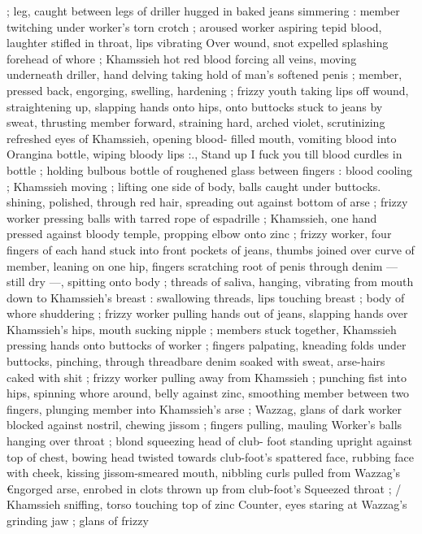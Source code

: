 ; leg, caught between legs of driller hugged in baked jeans 
simmering : member twitching under worker's torn crotch ; aroused 
worker aspiring tepid blood, laughter stifled in throat, lips vibrating 
Over wound, snot expelled splashing forehead of whore ; Khamssieh 
hot red blood forcing all veins, moving underneath driller, hand 
delving taking hold of man's softened penis ; member, pressed back, 
engorging, swelling, hardening ; frizzy youth taking lips off wound, 
straightening up, slapping hands onto hips, onto buttocks stuck to 
jeans by sweat, thrusting member forward, straining hard, arched 
violet, scrutinizing refreshed eyes of Khamssieh, opening blood- 
filled mouth, vomiting blood into Orangina bottle, wiping bloody lips 
:{\gl}., Stand up{\td} I fuck you till blood curdles in bottle{\thd} ; holding 
bulbous bottle of roughened glass between fingers : blood cooling ; 
Khamssieh moving ; lifting one side of body, balls caught under 
buttocks. shining, polished, through red hair, spreading out against 
bottom of arse ; frizzy worker pressing balls with tarred rope of 
espadrille ; Khamssieh, one hand pressed against bloody temple, 
propping elbow onto zinc ; frizzy worker, four fingers of each hand 
stuck into front pockets of jeans, thumbs joined over curve of 
member, leaning on one hip, fingers scratching root of penis through 
denim --- still dry ---, spitting onto body ; threads of saliva, hanging, 
vibrating from mouth down to Khamssieh's breast : swallowing 
threads, lips touching breast ; body of whore shuddering ; frizzy 
worker pulling hands out of jeans, slapping hands over Khamssieh's 
hips, mouth sucking nipple ; members stuck together, Khamssieh 
pressing hands onto buttocks of worker ; fingers palpating, kneading 
folds under buttocks, pinching, through threadbare denim soaked 
with sweat, arse-hairs caked with shit ; frizzy worker pulling away 
from Khamssieh ; punching fist into hips, spinning whore around, 
belly against zinc, smoothing member between two fingers, plunging 
member into Khamssieh's arse ; Wazzag, glans of dark worker 
blocked against nostril, chewing jissom ; fingers pulling, mauling 
Worker's balls hanging over throat ; blond squeezing head of club- 
foot standing upright against top of chest, bowing head twisted 
towards club-foot's spattered face, rubbing face with cheek, kissing 
jissom-smeared mouth, nibbling curls pulled from Wazzag's 
€ngorged arse, enrobed in clots thrown up from club-foot's 
Squeezed throat ; {\slash} Khamssieh sniffing, torso touching top of zinc 
Counter, eyes staring at Wazzag's grinding jaw ; glans of frizzy 
